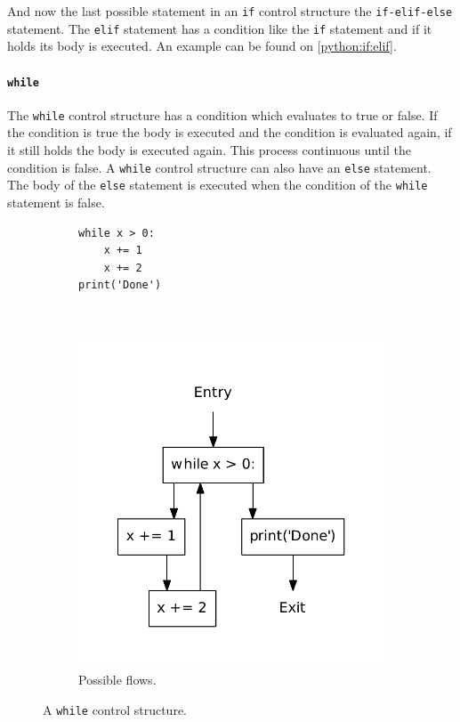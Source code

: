 And now the last possible statement in an \texttt{if} control structure the \texttt{if-elif-else} statement.
The \texttt{elif} statement has a condition like the \texttt{if} statement and if it holds its body is executed.
An example can be found on \cref{python:if:elif}.


\paragraph{\texttt{while}}
The \texttt{while} control structure has a condition which evaluates to true or false.
If the condition is true the body is executed and the condition is evaluated again, if it still holds the body is executed again.
This process continuous until the condition is false.
A \texttt{while} control structure can also have an \texttt{else} statement.
The body of the \texttt{else} statement is executed when the condition of the \texttt{while} statement is false.

\begin{figure}
  \centering
  \begin{subfigure}[b]{0.4\textwidth}
    \begin{lstlisting}[style=python, caption={Code example.}, label={python:while:code}]
while x > 0:
    x += 1
    x += 2
print('Done')
    \end{lstlisting}
  \end{subfigure}
  ~ %
  \begin{subfigure}[b]{0.4\textwidth}
    \centering
    \includegraphics[scale=.5]{./figures/while_no_orelse.pdf}
    \caption{Possible flows.}
    \label{python:while:flow}
  \end{subfigure}
  \caption{A \texttt{while} control structure.}
  \label{python:while}
\end{figure}

